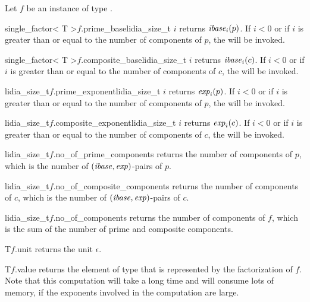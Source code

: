 \ACCS

Let $f$ be an instance of type .

\begin{fcode}{single_factor< T >}{$f$.prime_base}{lidia_size_t $i$}
  returns $\mathit{ibase}_i(p)$.  If $i < 0$ or if $i$ is greater than or equal to the number of components
  of $p$, the \LEH will be invoked.
\end{fcode}

\begin{fcode}{single_factor< T >}{$f$.composite_base}{lidia_size_t $i$}
  returns $\mathit{ibase}_i(c)$.  If $i < 0$ or if $i$ is greater than or equal to the number of components
  of $c$, the \LEH will be invoked.
\end{fcode}

\begin{fcode}{lidia_size_t}{$f$.prime_exponent}{lidia_size_t $i$}
  returns $\mathit{exp}_i(p)$.  If $i < 0$ or if $i$ is greater than or equal to the number of components of
  $p$, the \LEH will be invoked.
\end{fcode}

\begin{fcode}{lidia_size_t}{$f$.composite_exponent}{lidia_size_t $i$}
  returns $\mathit{exp}_i(c)$.  If $i < 0$ or if $i$ is greater than or equal to the number of components of
  $c$, the \LEH will be invoked.
\end{fcode}

\begin{fcode}{lidia_size_t}{$f$.no_of_prime_components}{}
  returns the number of components of $p$, which is the number of $(\mathit{ibase}, \mathit{exp})$-pairs of $p$.
\end{fcode}

\begin{fcode}{lidia_size_t}{$f$.no_of_composite_components}{}
  returns the number of components of $c$, which is the number of $(\mathit{ibase}, \mathit{exp})$-pairs of $c$.
\end{fcode}

\begin{fcode}{lidia_size_t}{$f$.no_of_components}{}
  returns the number of components of $f$, which is the sum of the number of prime and composite
  components.
\end{fcode}

\begin{fcode}{T}{$f$.unit}{}
  returns the unit $\epsilon$.
\end{fcode}

\begin{fcode}{T}{$f$.value}{}
  returns the element of type  that is represented by the factorization of $f$.  Note
  that this computation will take a long time and will consume lots of memory, if the exponents
  involved in the computation are large.
\end{fcode}


